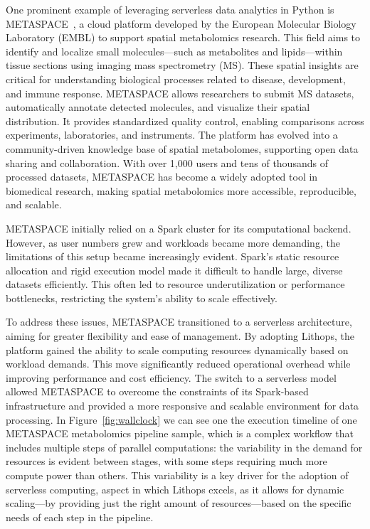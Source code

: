 One prominent example of leveraging serverless data analytics in Python is METASPACE~\citep{metaspace}, a cloud platform developed by the European Molecular Biology Laboratory (EMBL) to support spatial metabolomics research. This field aims to identify and localize small molecules—such as metabolites and lipids—within tissue sections using imaging mass spectrometry (MS). These spatial insights are critical for understanding biological processes related to disease, development, and immune response. METASPACE allows researchers to submit MS datasets, automatically annotate detected molecules, and visualize their spatial distribution. It provides standardized quality control, enabling comparisons across experiments, laboratories, and instruments. The platform has evolved into a community-driven knowledge base of spatial metabolomes, supporting open data sharing and collaboration. With over 1,000 users and tens of thousands of processed datasets, METASPACE has become a widely adopted tool in biomedical research, making spatial metabolomics more accessible, reproducible, and scalable.

METASPACE initially relied on a Spark cluster for its computational backend. However, as user numbers grew and workloads became more demanding, the limitations of this setup became increasingly evident. Spark’s static resource allocation and rigid execution model made it difficult to handle large, diverse datasets efficiently. This often led to resource underutilization or performance bottlenecks, restricting the system’s ability to scale effectively.

To address these issues, METASPACE transitioned to a serverless architecture, aiming for greater flexibility and ease of management. By adopting Lithops, the platform gained the ability to scale computing resources dynamically based on workload demands. This move significantly reduced operational overhead while improving performance and cost efficiency. The switch to a serverless model allowed METASPACE to overcome the constraints of its Spark-based infrastructure and provided a more responsive and scalable environment for data processing. In Figure~\ref{fig:wallclock} we can see one the execution timeline of one METASPACE metabolomics pipeline sample, which is a complex workflow that includes multiple steps of parallel computations: the variability in the demand for resources is evident between stages, with some steps requiring much more compute power than others. This variability is a key driver for the adoption of serverless computing, aspect in which Lithops excels, as it allows for dynamic scaling---by providing just the right amount of resources---based on the specific needs of each step in the pipeline.

